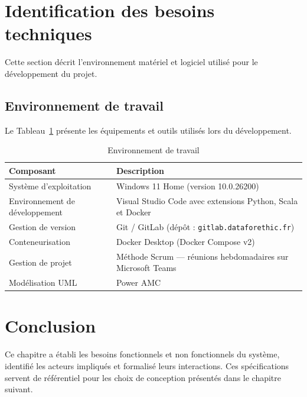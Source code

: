 \section{Identification des besoins techniques}

Cette section décrit l'environnement matériel et logiciel utilisé pour le développement du projet.

\subsection{Environnement de travail}

Le Tableau~\ref{tab:env_travail} présente les équipements et outils utilisés lors du développement.

\vspace{6pt}
\begin{table}[H]
\caption{Environnement de travail}
\label{tab:env_travail}
\centering
\small
\setlength{\tabcolsep}{4pt}
\begin{tabular}{|p{4cm}|p{10.5cm}|}
\hline
\textbf{Composant} & \textbf{Description} \\
\hline
Système d'exploitation & Windows 11 Home (version 10.0.26200) \\
\hline
Environnement de développement & Visual Studio Code avec extensions Python, Scala et Docker \\
\hline
Gestion de version    & Git / GitLab (dépôt : \texttt{gitlab.dataforethic.fr}) \\
\hline
Conteneurisation      & Docker Desktop (Docker Compose v2) \cite{docker} \\
\hline
Gestion de projet     & Méthode Scrum \cite{scrumguide} — réunions hebdomadaires sur Microsoft Teams \\
\hline
Modélisation UML      & Power AMC \\
\hline
\end{tabular}
\end{table}


\section*{Conclusion}

Ce chapitre a établi les besoins fonctionnels et non fonctionnels du système,
identifié les acteurs impliqués et formalisé leurs interactions.
Ces spécifications servent de référentiel pour les choix de conception présentés
dans le chapitre suivant.

